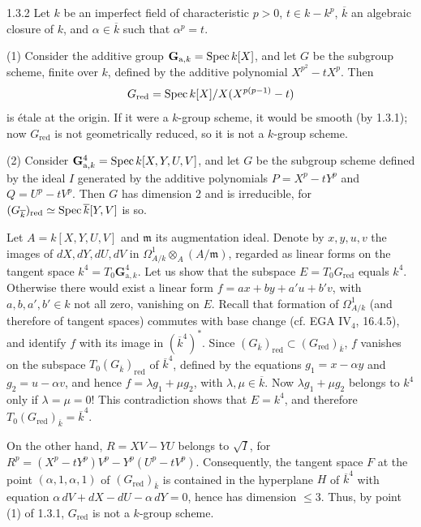 \begin{examples}{1.3.2}\label{VIA.1.3.2}
Let $k$ be an imperfect field of characteristic $p>0$, $t\in k-k^p$, $\overline k$ an algebraic closure of $k$, and $\alpha\in\overline k$ such that $\alpha^p=t$.

(1) Consider the additive group $\mathbf G_{\mathrm a,k}=\operatorname{Spec} k[X]$, and let $G$ be the subgroup scheme, finite over $k$, defined by the additive polynomial $X^{p^2}-tX^p$. Then
\[
G_{\mathrm{red}}=\operatorname{Spec} k[X]/X(X^{p(p-1)}-t)
\]
is étale at the origin. If it were a $k$-group scheme, it would be smooth (by 1.3.1); now $G_{\mathrm{red}}$ is not geometrically reduced, so it is not a $k$-group scheme.

(2) Consider $\mathbf G_{\mathrm a,k}^4=\operatorname{Spec} k[X,Y,U,V]$, and let $G$ be the subgroup scheme defined by the ideal $I$ generated by the additive polynomials $P=X^p-tY^p$ and $Q=U^p-tV^p$. Then $G$ has dimension 2 and is irreducible, for $(G_{\overline k})_{\mathrm{red}}\simeq\operatorname{Spec}\overline k[Y,V]$ is so.

Let $A=k[X,Y,U,V]$ and $\mathfrak m$ its augmentation ideal. Denote by $x,y,u,v$ the images of $dX,dY,dU,dV$ in $\Omega^1_{A/k}\otimes_A(A/\mathfrak m)$, regarded as linear forms on the tangent space $k^4=T_0\mathbf G_{\mathrm a,k}^4$. Let us show that the subspace $E=T_0G_{\mathrm{red}}$ equals $k^4$. Otherwise there would exist a linear form $f=ax+by+a'u+b'v$, with $a,b,a',b'\in k$ not all zero, vanishing on $E$. Recall that formation of $\Omega^1_{A/k}$ (and therefore of tangent spaces) commutes with base change (cf. EGA IV$_4$, 16.4.5), and identify $f$ with its image in $(\overline k^4)^*$. Since $(G_{\overline k})_{\mathrm{red}}\subset(G_{\mathrm{red}})_{\overline k}$, $f$ vanishes on the subspace $T_0(G_{\overline k})_{\mathrm{red}}$ of $\overline k^4$, defined by the equations $g_1=x-\alpha y$ and $g_2=u-\alpha v$, and hence $f=\lambda g_1+\mu g_2$, with $\lambda,\mu\in\overline k$. Now $\lambda g_1+\mu g_2$ belongs to $k^4$ only if $\lambda=\mu=0$! This contradiction shows that $E=k^4$, and therefore $T_0(G_{\mathrm{red}})_{\overline k}=\overline k^4$.

On the other hand, $R=XV-YU$ belongs to $\sqrt I$, for $R^p=(X^p-tY^p)V^p-Y^p(U^p-tV^p)$. Consequently, the tangent space $F$ at the point $(\alpha,1,\alpha,1)$ of $(G_{\mathrm{red}})_{\overline k}$ is contained in the hyperplane $H$ of $\overline k^4$ with equation $\alpha\,dV+dX-dU-\alpha\,dY=0$, hence has dimension $\leq3$. Thus, by point (1) of 1.3.1, $G_{\mathrm{red}}$ is not a $k$-group scheme.
\end{examples}

